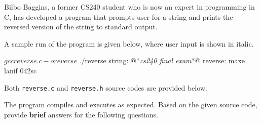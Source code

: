 \documentclass[12pt,letterpaper,twoside]{article}
\begin{document}
Bilbo Baggins, a former CS240 student who is now an expert in programming in C, has developed a program that prompts user for a string and prints the reversed version of the string to standard output.

A sample run of the program is given below, where user input is shown in italic.

\begin{terminal}
$ gcc reverse.c -o reverse
$ ./reverse
string: @*\textit{cs240 final exam}*@
reverse: maxe lanif 042sc
\end{terminal}

Both \texttt{reverse.c} and \texttt{reverse.h} source codes are provided below.

\lstset{language=c,tabsize=4}



The program compiles and executes as expected.
Based on the given source code, provide \textbf{brief} answers for the following questions.
\end{document}
